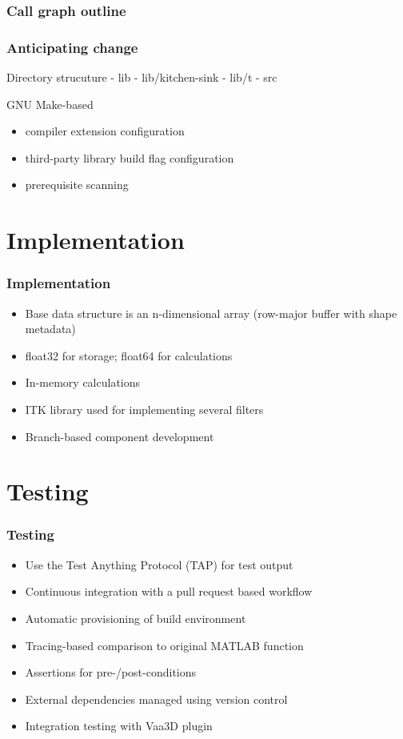 \documentclass{beamer}
\begin{document}
\begin{frame}\frametitle{Call graph outline}
\end{frame}

\begin{frame}\frametitle{Anticipating change}
	Directory strucuture
- lib
- lib/kitchen-sink
- lib/t
- src
\end{frame}

\begin{frame}
	GNU Make-based 
	\begin{itemize}
		\item compiler extension configuration
		\item third-party library build flag configuration
		\item prerequisite scanning
	\end{itemize}
\end{frame}


\section{Implementation}

\begin{frame}
\frametitle{Implementation}
\begin{itemize}
	\item Base data structure is an n-dimensional array (row-major buffer with shape metadata)
	\item float32 for storage; float64 for calculations
	\item In-memory calculations
	\item ITK library used for implementing several filters
	\item Branch-based component development
\end{itemize}
\end{frame}

\section{Testing}

\begin{frame}
\frametitle{Testing}
\begin{itemize}
	\item Use the Test Anything Protocol (TAP) for test output
	\item Continuous integration with a pull request based workflow
	\item Automatic provisioning of build environment
	\item Tracing-based comparison to original MATLAB function
	\item Assertions for pre-/post-conditions
	\item External dependencies managed using version control
	\item Integration testing with Vaa3D plugin
\end{itemize}
\end{frame}
\end{document}
